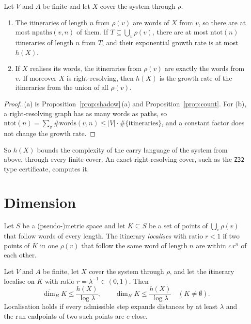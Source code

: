 \begin{theorem}\label{thm:count}
Let \(V\) and \(A\) be finite and let \(X\) cover the system through \(\rho\).
\begin{enumerate}[label=(\alph*)]
\item The itineraries of length \(n\) from \(\rho(v)\) are words of \(X\) from \(v\), so there
  are at most \(\mathrm{npaths}(v,n)\) of them. If \(T\subseteq\bigcup_v\rho(v)\), there are at
  most \(\mathrm{ntot}(n)\) itineraries of length \(n\) from \(T\), and their exponential growth
  rate is at most \(h(X)\).
\item If \(X\) realises its words, the itineraries from \(\rho(v)\) are exactly the words from
  \(v\). If moreover \(X\) is right-resolving, then \(h(X)\) is the growth rate of the
  itineraries from the union of all \(\rho(v)\).
\end{enumerate}
\end{theorem}

\begin{proof}
(a) is Proposition~\ref{prop:shadow}\,(a) and Proposition~\ref{prop:count}. For (b), a
right-resolving graph has as many words as paths, so
\(\mathrm{ntot}(n)=\sum_v\#\mathrm{words}(v,n)\le|V|\cdot\#\{\text{itineraries}\}\), and a
constant factor does not change the growth rate.
\end{proof}

So \(h(X)\) bounds the complexity of the carry language of the system from above, through every
finite cover. An exact right-resolving cover, such as the \texttt{Z32} type certificate,
computes it.

\section{Dimension}

Let \(S\) be a (pseudo-)metric space and let \(K\subseteq S\) be a set of points of
\(\bigcup_v\rho(v)\) that follow words of every length. The itinerary \emph{localises} with
ratio \(r<1\) if two points of \(K\) in one \(\rho(v)\) that follow the same word of length
\(n\) are within \(c\,r^n\) of each other.

\begin{theorem}\label{thm:dimension}
Let \(V\) and \(A\) be finite, let \(X\) cover the system through \(\rho\), and let the itinerary
localise on \(K\) with ratio \(r=\lambda^{-1}\in(0,1)\). Then
\[
\overline{\dim}_B K\le\frac{h(X)}{\log\lambda},\qquad
\dim_H K\le\frac{h(X)}{\log\lambda}\quad(K\ne\emptyset).
\]
Localisation holds if every admissible step expands distances by at least \(\lambda\) and the run
endpoints of two such points are \(c\)-close.
\end{theorem}

